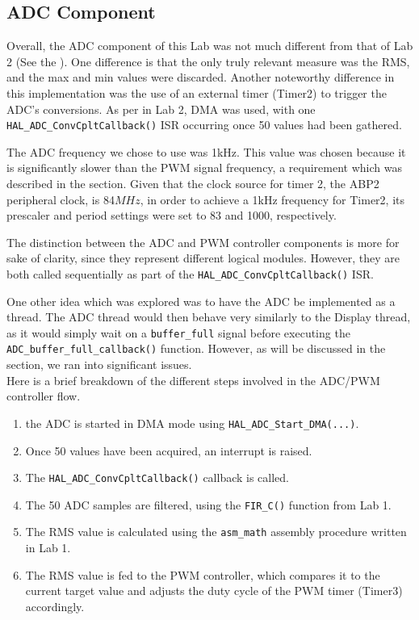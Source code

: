 \subsection{ADC Component}

Overall, the ADC component of this Lab was not much different from that of Lab 2 (See the ). One difference is that the only truly relevant measure was the RMS, and the max and min values were discarded. Another noteworthy difference in this implementation was the use of an external timer (Timer2) to trigger the ADC's conversions. As per in Lab 2, DMA was used, with one \verb|HAL_ADC_ConvCpltCallback()| ISR occurring once 50 values had been gathered.


The ADC frequency we chose to use was 1kHz. This value was chosen because it is significantly slower than the PWM signal frequency, a requirement which was described in the  section. Given that the clock source for timer 2, the ABP2 peripheral clock, is 84\(MHz\), in order to achieve a 1kHz frequency for Timer2, its prescaler and period settings were set to 83 and 1000, respectively. 


The distinction between the ADC and PWM controller components is more for sake of clarity, since they represent different logical modules. However, they are both called sequentially as part of the \verb|HAL_ADC_ConvCpltCallback()| ISR. 



One other idea which was explored was to have the ADC be implemented as a thread. The ADC thread would then behave very similarly to the Display thread, as it would simply wait on a \verb|buffer_full| signal before executing the \verb|ADC_buffer_full_callback()| function. However, as will be discussed in the  section, we ran into significant issues.\\



Here is a brief breakdown of the different steps involved in the ADC/PWM controller  flow.
\begin{enumerate}
\item the ADC is started in DMA mode using \verb|HAL_ADC_Start_DMA(...)|.
\item Once 50 values have been acquired, an interrupt is raised.
\item The \verb|HAL_ADC_ConvCpltCallback()| callback is called.
\item The 50 ADC samples are filtered, using the \verb|FIR_C()| function from Lab 1.
\item The RMS value is calculated using the \verb|asm_math| assembly procedure written in Lab 1.
\item The RMS value is fed to the PWM controller, which compares it to the current target value and adjusts the duty cycle of the PWM timer (Timer3) accordingly.
\end{enumerate}



